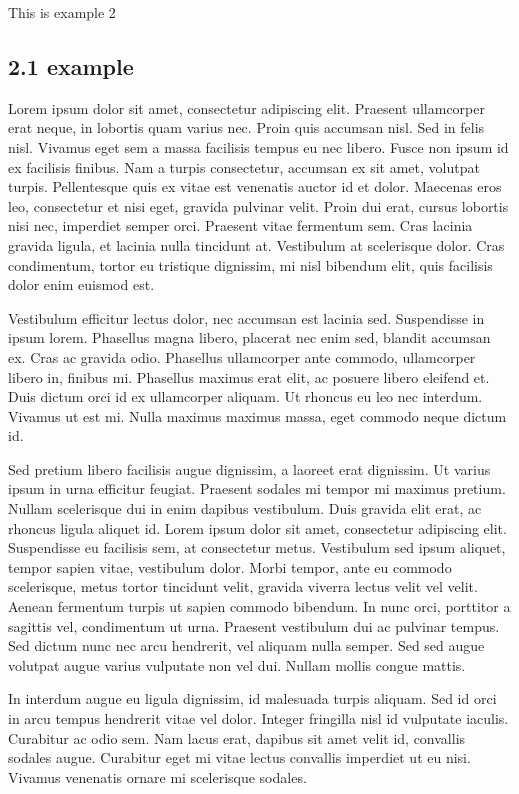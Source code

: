 This is example 2

\subsection{2.1 example}

Lorem ipsum dolor sit amet, consectetur adipiscing elit. Praesent ullamcorper erat neque, in lobortis quam varius nec. Proin quis accumsan nisl. Sed in felis nisl. Vivamus eget sem a massa facilisis tempus eu nec libero. Fusce non ipsum id ex facilisis finibus. Nam a turpis consectetur, accumsan ex sit amet, volutpat turpis. Pellentesque quis ex vitae est venenatis auctor id et dolor. Maecenas eros leo, consectetur et nisi eget, gravida pulvinar velit. Proin dui erat, cursus lobortis nisi nec, imperdiet semper orci. Praesent vitae fermentum sem. Cras lacinia gravida ligula, et lacinia nulla tincidunt at. Vestibulum at scelerisque dolor. Cras condimentum, tortor eu tristique dignissim, mi nisl bibendum elit, quis facilisis dolor enim euismod est.

Vestibulum efficitur lectus dolor, nec accumsan est lacinia sed. Suspendisse in ipsum lorem. Phasellus magna libero, placerat nec enim sed, blandit accumsan ex. Cras ac gravida odio. Phasellus ullamcorper ante commodo, ullamcorper libero in, finibus mi. Phasellus maximus erat elit, ac posuere libero eleifend et. Duis dictum orci id ex ullamcorper aliquam. Ut rhoncus eu leo nec interdum. Vivamus ut est mi. Nulla maximus maximus massa, eget commodo neque dictum id.

Sed pretium libero facilisis augue dignissim, a laoreet erat dignissim. Ut varius ipsum in urna efficitur feugiat. Praesent sodales mi tempor mi maximus pretium. Nullam scelerisque dui in enim dapibus vestibulum. Duis gravida elit erat, ac rhoncus ligula aliquet id. Lorem ipsum dolor sit amet, consectetur adipiscing elit. Suspendisse eu facilisis sem, at consectetur metus. Vestibulum sed ipsum aliquet, tempor sapien vitae, vestibulum dolor. Morbi tempor, ante eu commodo scelerisque, metus tortor tincidunt velit, gravida viverra lectus velit vel velit. Aenean fermentum turpis ut sapien commodo bibendum. In nunc orci, porttitor a sagittis vel, condimentum ut urna. Praesent vestibulum dui ac pulvinar tempus. Sed dictum nunc nec arcu hendrerit, vel aliquam nulla semper. Sed sed augue volutpat augue varius vulputate non vel dui. Nullam mollis congue mattis.

In interdum augue eu ligula dignissim, id malesuada turpis aliquam. Sed id orci in arcu tempus hendrerit vitae vel dolor. Integer fringilla nisl id vulputate iaculis. Curabitur ac odio sem. Nam lacus erat, dapibus sit amet velit id, convallis sodales augue. Curabitur eget mi vitae lectus convallis imperdiet ut eu nisi. Vivamus venenatis ornare mi scelerisque sodales.

